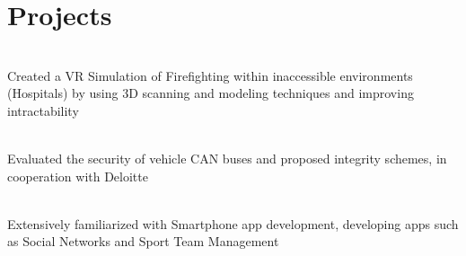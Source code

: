 \documentclass[]{deedy-resume-openfont}
\begin{document}
\section{Projects}
\raggedright


\\
Created a VR Simulation of Firefighting within inaccessible environments (Hospitals) by using 3D scanning and modeling techniques and improving intractability\\
\sectionsep
  

\\
Evaluated the security of vehicle CAN buses and proposed integrity schemes, in cooperation with Deloitte\\
\sectionsep
  

\\
Extensively familiarized with Smartphone app development, developing apps such as Social Networks and Sport Team Management\\
\sectionsep
\end{document}
